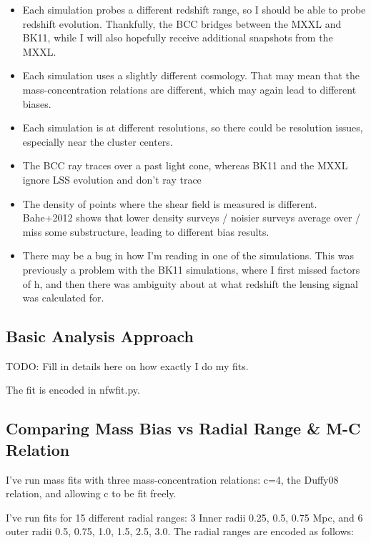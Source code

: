 \documentclass[11pt]{article}
\begin{document}
\begin{itemize}
\item Each simulation probes a different redshift range, so I should be able to probe redshift evolution. Thankfully, the BCC bridges between the MXXL and BK11, while I will also hopefully receive additional snapshots from the MXXL. 
\item Each simulation uses a slightly different cosmology. That may mean that the mass-concentration relations are different, which may again lead to different biases. 
\item Each simulation is at different resolutions, so there could be resolution issues, especially near the cluster centers. 
\item The BCC ray traces over a past light cone, whereas BK11 and the MXXL ignore LSS evolution and don't ray trace
\item The density of points where the shear field is measured is different. Bahe+2012 shows that lower density surveys / noisier surveys average over / miss some substructure, leading to different bias results.
\item There may be a bug in how I'm reading in one of the simulations. This was previously a problem with the BK11 simulations, where I first missed factors of h, and then there was ambiguity about at what redshift the lensing signal was calculated for.
\end{itemize}

\subsection{Basic Analysis Approach}

TODO: Fill in details here on how exactly I do my fits.

The fit is encoded in nfwfit.py. 


\subsection{Comparing Mass Bias vs Radial Range \& M-C Relation}
\label{sec:consistant_bias_mcrelation}

I've run mass fits with three mass-concentration relations: c=4, the Duffy08 relation, and allowing c to be fit freely.

I've run fits for 15 different radial ranges: 3 Inner radii {0.25, 0.5, 0.75 Mpc}, and 6 outer radii {0.5, 0.75, 1.0, 1.5, 2.5, 3.0}. The radial ranges are encoded as follows:
\end{document}
